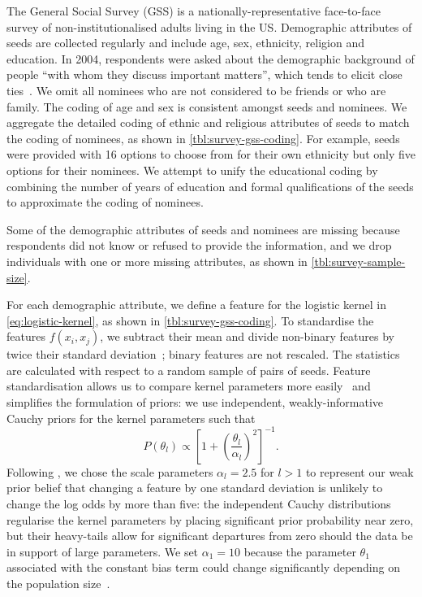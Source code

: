 \documentclass{scrartcl}
\begin{document}
The General Social Survey (GSS) is a nationally-representative face-to-face survey of non-institutionalised adults living in the US. Demographic attributes of seeds are collected regularly and include age, sex, ethnicity, religion and education. In 2004, respondents were asked about the demographic background of people ``with whom they discuss important matters'', which tends to elicit close ties~\cite{Marin2004}. We omit all nominees who are not considered to be friends or who are family. The coding of age and sex is consistent amongst seeds and nominees. We aggregate the detailed coding of ethnic and religious attributes of seeds to match the coding of nominees, as shown in \cref{tbl:survey-gss-coding}. For example, seeds were provided with 16 options to choose from for their own ethnicity but only five options for their nominees. We attempt to unify the educational coding by combining the number of years of education and formal qualifications of the seeds to approximate the coding of nominees.

Some of the demographic attributes of seeds and nominees are missing because respondents did not know or refused to provide the information, and we drop individuals with one or more missing attributes, as shown in \cref{tbl:survey-sample-size}. %

For each demographic attribute, we define a feature for the logistic kernel in \cref{eq:logistic-kernel}, as shown in \cref{tbl:survey-gss-coding}. To standardise the features $f(x_i,x_j)$, we subtract their mean and divide non-binary features by twice their standard deviation~\cite{Gelman2008a}; binary features are not rescaled. The statistics are calculated with respect to a random sample of pairs of seeds. Feature standardisation allows us to compare kernel parameters more easily~\cite{Gelman2008a} and simplifies the formulation of priors: we use independent, weakly-informative Cauchy priors for the kernel parameters such that
\[
    P(\theta_l) \propto {\left[1+{\left(\frac{\theta_l}{\alpha_l}\right)}^2\right]}^{-1}.
\]
Following \textcite{Gelman2008}, we chose the scale parameters $\alpha_l=2.5$ for $l>1$ to represent our weak prior belief that changing a feature by one standard deviation is unlikely to change the log odds by more than five: the independent Cauchy distributions regularise the kernel parameters by placing significant prior probability near zero, but their heavy-tails allow for significant departures from zero should the data be in support of large parameters. %
We set $\alpha_1=10$ because the parameter $\theta_1$ associated with the constant bias term could change significantly depending on the population size~\cite{Gelman2013}.
\end{document}
